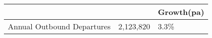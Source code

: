 \begin{tabular}[t]{|p{4.7cm}|p{1.25cm}|p{1.3cm}|}
  \hline
  &   & Growth(pa) \\ 
  \hline
Annual Outbound Departures & 2,123,820 & 3.3\% \\ 
   \hline
\end{tabular}
